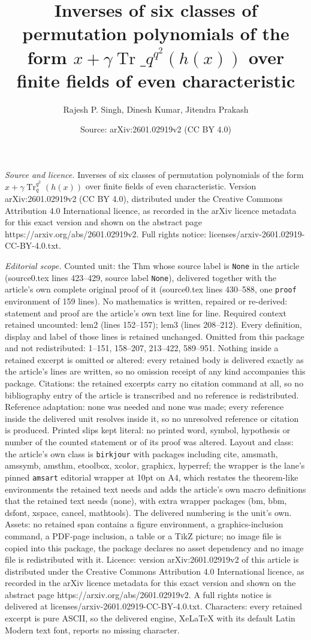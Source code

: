 \documentclass[10pt,a4paper]{amsart}
\title[Inverses of six classes of permutation polynomials of the fo]{Inverses of six classes of permutation polynomials of the form $x+\gamma\operatorname{Tr}\_q^{q^2}(h(x))$ over finite fields of even characteristic}
\author{Rajesh P. Singh, Dinesh Kumar, Jitendra Prakash}
\date{Source: arXiv:2601.02919v2 (CC BY 4.0)}
\begin{document}
\maketitle

\noindent\emph{Source and licence.} Inverses of six classes of permutation polynomials of the form $x+\gamma\operatorname{Tr}_q^{q^2}(h(x))$ over finite fields of even characteristic. Version arXiv:2601.02919v2 (CC BY 4.0), distributed under the Creative Commons Attribution 4.0 International licence, as recorded in the arXiv licence metadata for this exact version and shown on the abstract page https://arxiv.org/abs/2601.02919v2. Full rights notice: licenses/arxiv-2601.02919-CC-BY-4.0.txt.\par\smallskip

\noindent\textit{Editorial scope.} Counted unit: the Thm whose source label is \texttt{None} in the article (source0.tex lines 423--429, source label \texttt{None}), delivered together with the article's own complete original proof of it (source0.tex lines 430--588, one \texttt{proof} environment of 159 lines). No mathematics is written, repaired or re-derived: statement and proof are the article's own text line for line. Required context retained uncounted: lem2 (lines 152--157); lem3 (lines 208--212). Every definition, display and label of those lines is retained unchanged. Omitted from this package and not redistributed: 1--151, 158--207, 213--422, 589--951. Nothing inside a retained excerpt is omitted or altered: every retained body is delivered exactly as the article's lines are written, so no omission receipt of any kind accompanies this package. Citations: the retained excerpts carry no citation command at all, so no bibliography entry of the article is transcribed and no reference is redistributed. Reference adaptation: none was needed and none was made; every reference inside the delivered unit resolves inside it, so no unresolved reference or citation is produced. Printed slips kept literal: no printed word, symbol, hypothesis or number of the counted statement or of its proof was altered. Layout and class: the article's own class is \texttt{birkjour} with packages including cite, amsmath, amssymb, amsthm, etoolbox, xcolor, graphicx, hyperref; the wrapper is the lane's pinned \texttt{amsart} editorial wrapper at 10pt on A4, which restates the theorem-like environments the retained text needs and adds the article's own macro definitions that the retained text needs (none), with extra wrapper packages (bm, bbm, dsfont, xspace, cancel, mathtools). The delivered numbering is the unit's own. Assets: no retained span contains a figure environment, a graphics-inclusion command, a PDF-page inclusion, a table or a TikZ picture; no image file is copied into this package, the package declares no asset dependency and no image file is redistributed with it. Licence: version arXiv:2601.02919v2 of this article is distributed under the Creative Commons Attribution 4.0 International licence, as recorded in the arXiv licence metadata for this exact version and shown on the abstract page https://arxiv.org/abs/2601.02919v2. A full rights notice is delivered at licenses/arxiv-2601.02919-CC-BY-4.0.txt. Characters: every retained excerpt is pure ASCII, so the delivered engine, XeLaTeX with its default Latin Modern text font, reports no missing character.
\end{document}
